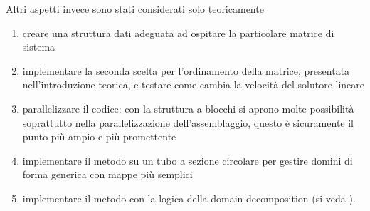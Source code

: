 Altri aspetti invece sono stati considerati solo teoricamente
\begin{enumerate}
 \item creare una struttura dati adeguata ad ospitare la particolare matrice di sistema
 \item implementare la seconda scelta per l'ordinamento della matrice, presentata 
 nell'introduzione teorica, e testare come cambia la velocit\`a del solutore lineare
 \item parallelizzare il codice: con la struttura a blocchi si aprono molte possibilit\`a
 soprattutto nella parallelizzazione dell'assemblaggio, questo \`e sicuramente il punto pi\`u ampio e pi\`u promettente
 \item implementare il metodo su un tubo a sezione circolare per gestire domini di forma generica con mappe pi\`u semplici
 \item implementare il metodo con la logica della domain decomposition (si veda \cite{perotto:2009}).
\end{enumerate}
